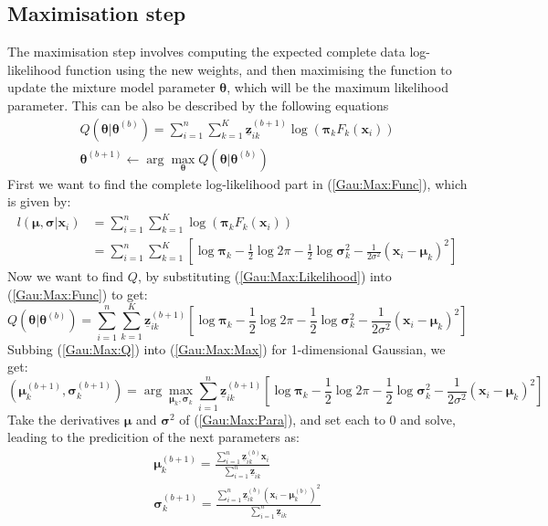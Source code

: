 \documentclass[12pt]{article}
\newcommand{\vect}[1]{\boldsymbol{#1}}
\newcommand{\mat}[1]{\underline{\boldsymbol{#1}}}
\begin{document}
\subsection{Maximisation step}
The maximisation step involves computing the expected complete data log-likelihood function using the new weights, and then maximising the function to update the mixture model parameter $\vect{\theta}$, which will be the maximum likelihood parameter. This can be also be described by the following equations
\begin{gather}
  \label{Gau:Max:Func}
  Q(\vect{\theta}|\vect{\theta}^{(b)}) =
          \sum_{i=1}^n\sum_{k=1}^K\mat{z}_{ik}^{(b+1)}\log(\vect{\pi}_kF_k(\vect{x}_i)) \\
  \label{Gau:Max:Max}
  \vect{\theta}^{(b+1)} \leftarrow \arg\max_{\vect{\theta}}Q(\vect{\theta}|\vect{\theta}^{(b)})
\end{gather}
First we want to find the complete log-likelihood part in (\ref{Gau:Max:Func}), which is given by:
\begin{align} \label{Gau:Max:Likelihood}
  l(\vect{\mu}, \vect{\sigma}|\vect{x}_i)
                  & = \sum_{i=1}^n\sum_{k=1}^K\log(\vect{\pi}_kF_k(\vect{x}_i)) \nonumber \\
          & = \sum_{i=1}^n\sum_{k=1}^K\left[\log{\vect{\pi}_k-\frac{1}{2}\log2\pi-\frac{1}{2}\log\vect{\sigma}^2_k}
                                    -\frac{1}{{2\sigma^2}}(\vect{x}_i-\vect{\mu}_k)^2\right]
\end{align}
Now we want to find $Q$, by substituting (\ref{Gau:Max:Likelihood}) into (\ref{Gau:Max:Func}) to get:
\begin{equation} \label{Gau:Max:Q}
  Q(\vect{\theta}|\vect{\theta}^{(b)}) =  \sum_{i=1}^n\sum_{k=1}^K
            \mat{z}_{ik}^{(b+1)}\left[\log{\vect{\pi}_k-\frac{1}{2}\log2\pi
            -\frac{1}{2}\log\vect{\sigma}^2_k}-\frac{1}{{2\sigma^2}}(\vect{x}_i-\vect{\mu}_k)^2\right]
\end{equation}
Subbing (\ref{Gau:Max:Q}) into (\ref{Gau:Max:Max}) for 1-dimensional Gaussian, we get:
\begin{equation} \label{Gau:Max:Para}
  (\vect{\mu}_k^{(b+1)}, \vect{\sigma}_k^{(b+1)})
              = \arg\max_{\vect{\mu}_k, \vect{\sigma}_k} \sum_{i=1}^n
                        \mat{z}_{ik}^{(b+1)}\left[\log{\vect{\pi}_k-\frac{1}{2}\log2\pi
                        -\frac{1}{2}\log\vect{\sigma}^2_k}-\frac{1}{{2\sigma^2}}(\vect{x}_i-\vect{\mu}_k)^2\right]
\end{equation}
Take the derivatives $\vect{\mu}$ and $\vect{\sigma}^2$ of (\ref{Gau:Max:Para}), and set each to 0 and solve, leading to the predicition of the next parameters as:
\begin{gather}
  \vect{\mu}_k^{(b+1)}=\frac{\sum_{i=1}^n\mat{z}_{ik}^{(b)}\vect{x}_i}{\sum_{i=1}^n\mat{z}_{ik}} \\
  \vect{\sigma}_k^{(b+1)}=\frac{\sum_{i=1}^n\mat{z}_{ik}^{(b)}(\vect{x}_i-\vect{\mu}_k^{(b)})^2}
                               {\sum_{i=1}^n\mat{z}_{ik}}
\end{gather}
\end{document}
